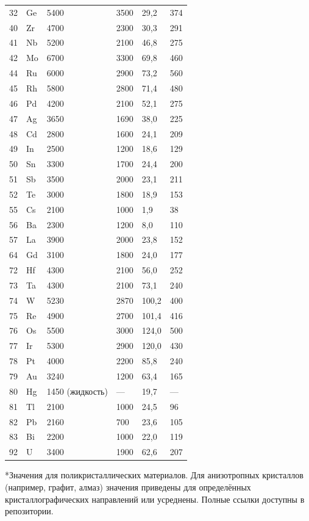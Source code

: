 \documentclass[12pt,a4paper]{article}
\begin{document}
\begin{longtable}{p{0.8cm}p{1.2cm}p{2.2cm}p{2.2cm}p{2.2cm}p{2.2cm}}
		32 & Ge & 5400 & 3500 & 29,2 & 374 \\
		40 & Zr & 4700 & 2300 & 30,3 & 291 \\
		41 & Nb & 5200 & 2100 & 46,8 & 275 \\
		42 & Mo & 6700 & 3300 & 69,8 & 460 \\
		44 & Ru & 6000 & 2900 & 73,2 & 560 \\
		45 & Rh & 5800 & 2800 & 71,4 & 480 \\
		46 & Pd & 4200 & 2100 & 52,1 & 275 \\
		47 & Ag & 3650 & 1690 & 38,0 & 225 \\
		48 & Cd & 2800 & 1600 & 24,1 & 209 \\
		49 & In & 2500 & 1200 & 18,6 & 129 \\
		50 & Sn & 3300 & 1700 & 24,4 & 200 \\
		51 & Sb & 3500 & 2000 & 23,1 & 211 \\
		52 & Te & 3000 & 1800 & 18,9 & 153 \\
		55 & Cs & 2100 & 1000 & 1,9 & 38 \\
		56 & Ba & 2300 & 1200 & 8,0 & 110 \\
		57 & La & 3900 & 2000 & 23,8 & 152 \\
		64 & Gd & 3100 & 1800 & 24,0 & 177 \\
		72 & Hf & 4300 & 2100 & 56,0 & 252 \\
		73 & Ta & 4300 & 2100 & 73,1 & 240 \\
		74 & W  & 5230 & 2870 & 100,2 & 400 \\
		75 & Re & 4900 & 2700 & 101,4 & 416 \\
		76 & Os & 5500 & 3000 & 124,0 & 500 \\
		77 & Ir & 5300 & 2900 & 120,0 & 430 \\
		78 & Pt & 4000 & 2200 & 85,8 & 240 \\
		79 & Au & 3240 & 1200 & 63,4 & 165 \\
		80 & Hg & 1450 (жидкость) & --- & 19,7 & --- \\
		81 & Tl & 2100 & 1000 & 24,5 & 96 \\
		82 & Pb & 2160 & 700 & 23,6 & 105 \\
		83 & Bi & 2200 & 1000 & 22,0 & 119 \\
		92 & U  & 3400 & 1900 & 62,6 & 207 \\
		\bottomrule
	\end{longtable}
	*Значения для поликристаллических материалов. Для анизотропных кристаллов (например, графит, алмаз) значения приведены для определённых кристаллографических направлений или усреднены. Полные ссылки доступны в репозитории.
	
\end{document}
